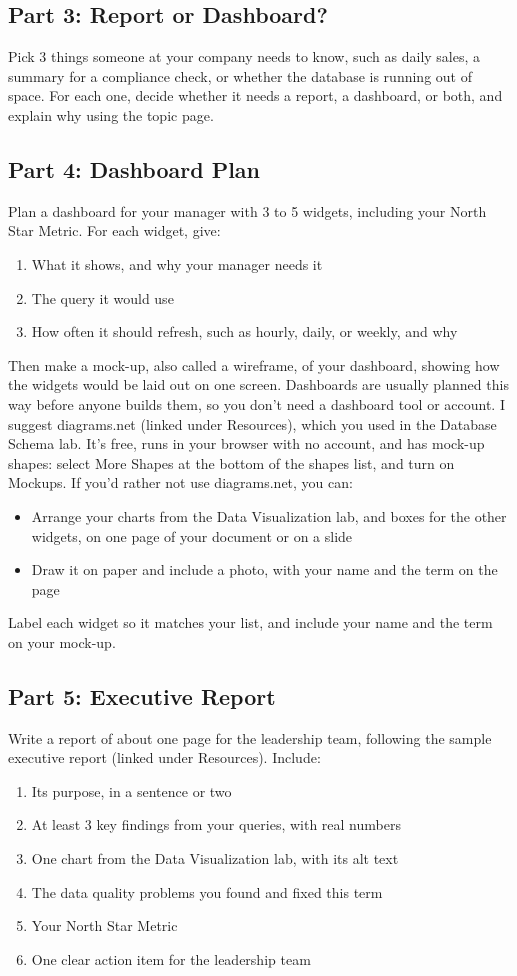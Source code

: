 \documentclass[12pt]{article}
\begin{document}
\subsection*{Part 3: Report or Dashboard?}
Pick 3 things someone at your company needs to know, such as daily sales, a summary for a compliance check, or whether the database is running out of space. For each one, decide whether it needs a report, a dashboard, or both, and explain why using the topic page.

\subsection*{Part 4: Dashboard Plan}
Plan a dashboard for your manager with 3 to 5 widgets, including your North Star Metric. For each widget, give:
\begin{enumerate}
    \item What it shows, and why your manager needs it
    \item The query it would use
    \item How often it should refresh, such as hourly, daily, or weekly, and why
\end{enumerate}
Then make a mock-up, also called a wireframe, of your dashboard, showing how the widgets would be laid out on one screen. Dashboards are usually planned this way before anyone builds them, so you don't need a dashboard tool or account. I suggest diagrams.net (linked under Resources), which you used in the Database Schema lab. It's free, runs in your browser with no account, and has mock-up shapes: select More Shapes at the bottom of the shapes list, and turn on Mockups. If you'd rather not use diagrams.net, you can:
\begin{itemize}
    \item Arrange your charts from the Data Visualization lab, and boxes for the other widgets, on one page of your document or on a slide
    \item Draw it on paper and include a photo, with your name and the term on the page
\end{itemize}
Label each widget so it matches your list, and include your name and the term on your mock-up.

\subsection*{Part 5: Executive Report}
Write a report of about one page for the leadership team, following the sample executive report (linked under Resources). Include:
\begin{enumerate}
    \item Its purpose, in a sentence or two
    \item At least 3 key findings from your queries, with real numbers
    \item One chart from the Data Visualization lab, with its alt text
    \item The data quality problems you found and fixed this term
    \item Your North Star Metric
    \item One clear action item for the leadership team
\end{enumerate}
\end{document}
